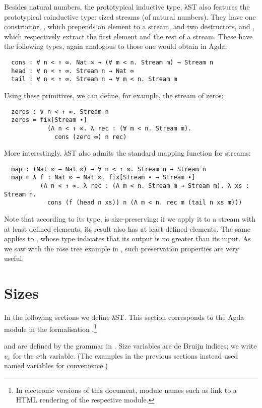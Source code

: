 Besides natural numbers, the prototypical inductive type, λST also features the
prototypical coinductive type: sized streams (of natural numbers). They have one
constructor, , which prepends an element to a stream, and two
destructors,  and , which respectively extract the first
element and the rest of a stream. These have the following types, again
analogous to those one would obtain in Agda:
\begin{verbatim}
  cons : ∀ n < ↑ ∞. Nat ∞ → (∀ m < n. Stream m) → Stream n
  head : ∀ n < ↑ ∞. Stream n → Nat ∞
  tail : ∀ n < ↑ ∞. Stream n → ∀ m < n. Stream m
\end{verbatim}
Using these primitives, we can define, for example, the stream of zeros:
\begin{verbatim}
  zeros : ∀ n < ↑ ∞. Stream n
  zeros ≔ fix[Stream ∙]
            (Λ n < ↑ ∞. λ rec : (∀ m < n. Stream m).
              cons (zero ∞) n rec)
\end{verbatim}
More interestingly, λST also admits the standard mapping function for streams:
\begin{verbatim}
  map : (Nat ∞ → Nat ∞) → ∀ n < ↑ ∞. Stream n → Stream n
  map ≔ λ f : Nat ∞ → Nat ∞. fix[Stream ∙ → Stream ∙]
          (Λ n < ↑ ∞. λ rec : (Λ m < n. Stream m → Stream m). λ xs : Stream n.
            cons (f (head n xs)) n (Λ m < n. rec m (tail n xs m)))
\end{verbatim}
Note that according to its type,  is size-preserving: if we apply it
to a stream with at least  defined elements, its result also has at
least  defined elements. The same applies to , whose type
indicates that its output is no greater than its input. As we saw with the rose
tree example in , such preservation properties are very
useful.


\section{Sizes}
\label{sec:source:sizes}

In the following sections we define λST. This section corresponds to the Agda
module  in the formalisation
\cite{limperg2019code}.\footnote{In electronic versions of this document, module
  names such as  link to a HTML
  rendering of the respective module.}

 and  are defined by the grammar in
. Size variables are de Bruijn indices; we write $v_x$ for
the $x$th variable. (The examples in the previous sections instead used named
variables for convenience.)

